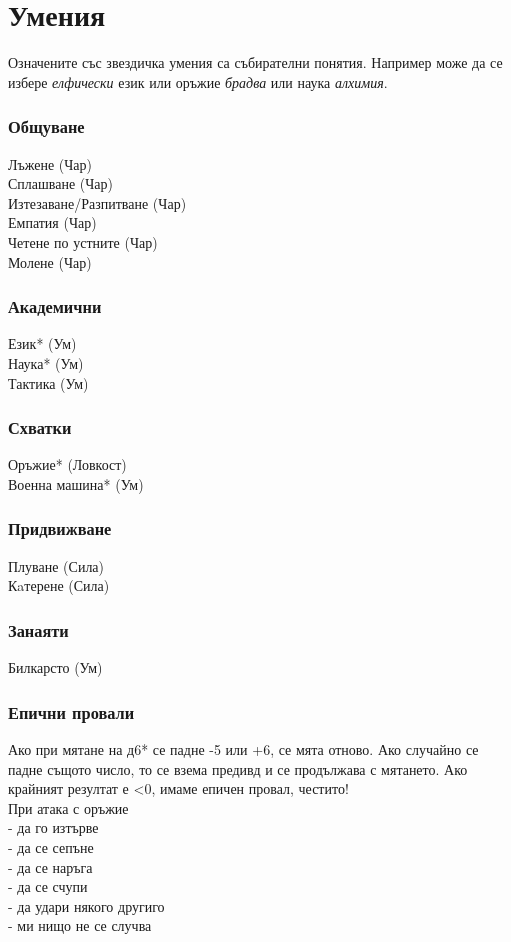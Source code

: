 \chapter{Умения}
Означените със звездичка умения са събирателни понятия.
Например може да се избере \textit{елфически} език или оръжие \textit{брадва} или наука \textit{алхимия}.
\subsection{Общуване}
Лъжене (Чар)                      \\
Сплашване (Чар)                   \\
Изтезаване/Разпитване (Чар)       \\
Емпатия (Чар)                     \\
Четене по устните (Чар)           \\
Молене (Чар)                      \\

\subsection{Академични}
Език* (Ум)                        \\
Наука* (Ум)                       \\
Тактика (Ум)                      \\

\subsection{Схватки}
Оръжие* (Ловкост)                 \\
Военна машина* (Ум)               \\

\subsection{Придвижване}
Плуване (Сила)                    \\
Кaтерене (Сила)                   \\

\subsection{Занаяти}
Билкарсто (Ум)                    \\

\subsection{Епични провали}
Ако при мятане на д6* се падне -5 или +6, се мята отново.
Ако случайно се падне същото число, то се взема предивд и се продължава с мятането.
Ако крайният резултат е <0, имаме епичен провал, честито!  \\

При атака с оръжие           \\
- да го изтърве              \\
- да се сепъне               \\
- да се наръга               \\
- да се счупи                \\
- да удари някого другиго    \\
- ми нищо не се случва       \\
